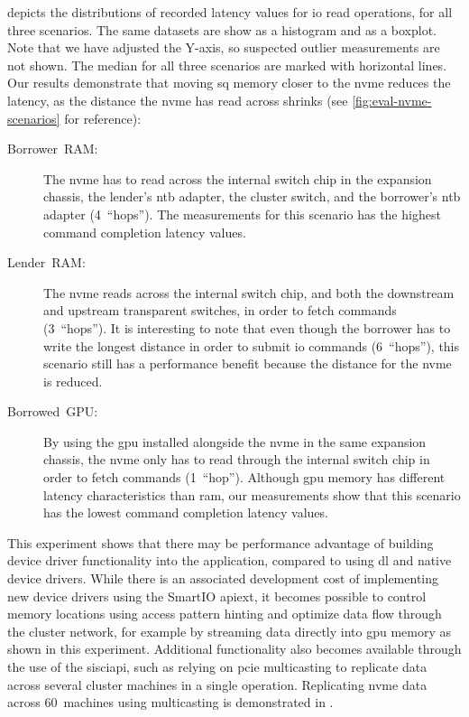  depicts the distributions of recorded latency values for \gls{io} read operations, for all three scenarios.
%
The same datasets are show as a histogram and as a boxplot.
%
Note that we have adjusted the Y-axis, so suspected outlier measurements are not shown.
%
The median for all three scenarios are marked with horizontal lines.
%
Our results demonstrate that moving \gls{sq} memory closer to the \gls{nvme} reduces the latency, as the distance the \gls{nvme} has read across shrinks (see \cref{fig:eval-nvme-scenarios} for reference):
%
\begin{description}
    \item[Borrower~RAM:]
        The \gls{nvme} has to read across the internal switch chip in the expansion chassis, the lender's \gls{ntb} adapter, the cluster switch, and the borrower's \gls{ntb} adapter (4~``hops'').
        The measurements for this scenario has the highest command completion latency values.
        

    \item[Lender~RAM:] 
        The \gls{nvme} reads across the internal switch chip, and both the downstream and upstream transparent switches, in order to fetch commands (3~``hops'').
        It is interesting to note that even though the borrower has to write the longest distance in order to submit \gls{io} commands (6~``hops''), this scenario still has a performance benefit because the distance for the \gls{nvme} is reduced.

    \item[Borrowed~GPU:]
        By using the \gls{gpu} installed alongside the \gls{nvme} in the same expansion chassis, the \gls{nvme} only has to read through the internal switch chip in order to fetch commands (1~``hop'').
        Although \gls{gpu} memory has different latency characteristics than \gls{ram}, our measurements show that this scenario has the lowest command completion latency values.
\end{description}



This experiment shows that there may be performance advantage of building device driver functionality into the application, compared to using \gls{dl} and native device drivers.
%
While there is an associated development cost of implementing new device drivers using the SmartIO \gls{apiext}, it becomes possible to control memory locations using access pattern hinting and optimize data flow through the cluster network, for example by streaming data directly into \gls{gpu} memory as shown in this experiment.
%
Additional functionality also becomes available through the use of the \gls{sisciapi}, such as relying on \gls{pcie} \gls{multicasting} to replicate data across several cluster machines in a single operation.
%
Replicating \gls{nvme} data across 60~machines using \gls{multicasting} is demonstrated in .




